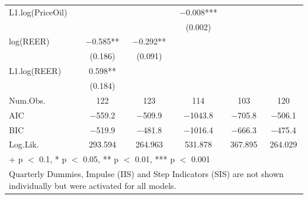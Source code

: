 \begin{table}
{\begin{tabular}[t]{lccccc}
L1.log(PriceOil) &  &  & \num{-0.008}*** &  & \\
 &  &  & (\num{0.002}) &  & \\
log(REER) & \num{-0.585}** & \num{-0.292}** &  &  & \\
 & (\num{0.186}) & (\num{0.091}) &  &  & \\
L1.log(REER) & \num{0.598}** &  &  &  & \\
 & (\num{0.184}) &  &  &  & \\
\midrule
Num.Obs. & \num{122} & \num{123} & \num{114} & \num{103} & \num{120}\\
AIC & \num{-559.2} & \num{-509.9} & \num{-1043.8} & \num{-705.8} & \num{-506.1}\\
BIC & \num{-519.9} & \num{-481.8} & \num{-1016.4} & \num{-666.3} & \num{-475.4}\\
Log.Lik. & \num{293.594} & \num{264.963} & \num{531.878} & \num{367.895} & \num{264.029}\\
\bottomrule
\multicolumn{6}{l}{\rule{0pt}{1em}+ p $<$ 0.1, * p $<$ 0.05, ** p $<$ 0.01, *** p $<$ 0.001}\\
\multicolumn{6}{l}{\rule{0pt}{1em}Quarterly Dummies, Impulse (IIS) and Step Indicators (SIS) are not shown individually but were activated for all models.}\\
\end{tabular}}
\end{table}

